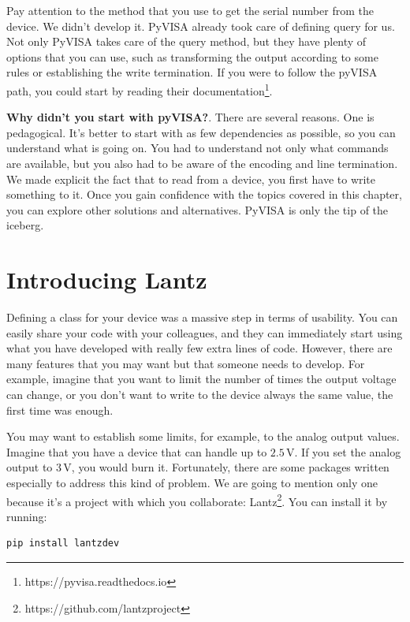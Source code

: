 Pay attention to the  method that you use to get the serial number from the device. We didn't develop it. PyVISA already took care of defining query for us. Not only PyVISA takes care of the query method, but they have plenty of options that you can use, such as transforming the output according to some rules or establishing the write termination. If you were to follow the pyVISA path, you could start by reading their documentation\footnote{https://pyvisa.readthedocs.io}.

\textbf{Why didn't you start with pyVISA?}. There are several reasons. One is pedagogical. It's better to start with as few dependencies as possible, so you can understand what is going on. You had to understand not only what commands are available, but you also had to be aware of the encoding and line termination. We made explicit the fact that to read from a device, you first have to write something to it. Once you gain confidence with the topics covered in this chapter, you can explore other solutions and alternatives. PyVISA is only the tip of the iceberg.

\section{Introducing Lantz}\label{sec:lantz}
Defining a class for your device was a massive step in terms of usability. You can easily share your code with your colleagues, and they can immediately start using what you have developed with really few extra lines of code. However, there are many features that you may want but that someone needs to develop. For example, imagine that you want to limit the number of times the output voltage can change, or you don't want to write to the device always the same value, the first time was enough.

You may want to establish some limits, for example, to the analog output values. Imagine that you have a device that can handle up to $2.5\,\textrm{V}$. If you set the analog output to $3\,\textrm{V}$, you would burn it. Fortunately, there are some packages written especially to address this kind of problem. We are going to mention only one because it's a project with which you collaborate: Lantz\footnote{https://github.com/lantzproject}. You can install it by running:

\begin{verbatim}
pip install lantzdev
\end{verbatim}


